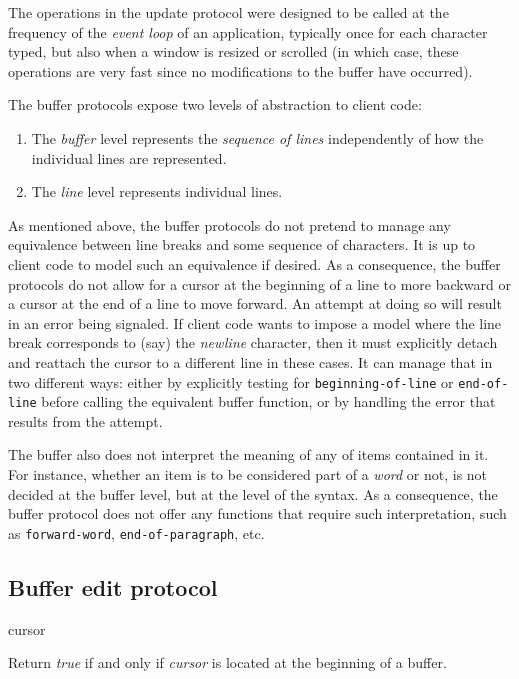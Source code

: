 The operations in the update protocol were designed to be called at
the frequency of the \emph{event loop} of an application, typically
once for each character typed, but also when a window is resized or
scrolled (in which case, these operations are very fast since no
modifications to the buffer have occurred). 

The buffer protocols expose two levels of abstraction to client code: 

\begin{enumerate}
\item The \emph{buffer} level represents the \emph{sequence of lines}
  independently of how the individual lines are represented.  
\item The \emph{line} level represents individual lines. 
\end{enumerate}

As mentioned above, the buffer protocols do not pretend to manage any
equivalence between line breaks and some sequence of characters.  It
is up to client code to model such an equivalence if desired.  As a
consequence, the buffer protocols do not allow for a cursor at the
beginning of a line to more backward or a cursor at the end of a line
to move forward.  An attempt at doing so will result in an error being
signaled.  If client code wants to impose a model where the line break
corresponds to (say) the \emph{newline} character, then it must
explicitly detach and reattach the cursor to a different line in these
cases.  It can manage that in two different ways: either by explicitly
testing for \texttt{beginning-of-line} or \texttt{end-of-line} before
calling the equivalent buffer function, or by handling the error that
results from the attempt.

The buffer also does not interpret the meaning of any of items
contained in it.  For instance, whether an item is to be considered
part of a \emph{word} or not, is not decided at the buffer level, but
at the level of the syntax.  As a consequence, the buffer protocol
does not offer any functions that require such interpretation, such as
\texttt{forward-word}, \texttt{end-of-paragraph}, etc. 

\subsection{Buffer edit protocol}

 {cursor}

Return \textit{true} if and only if \textit{cursor} is located at the
beginning of a buffer.

